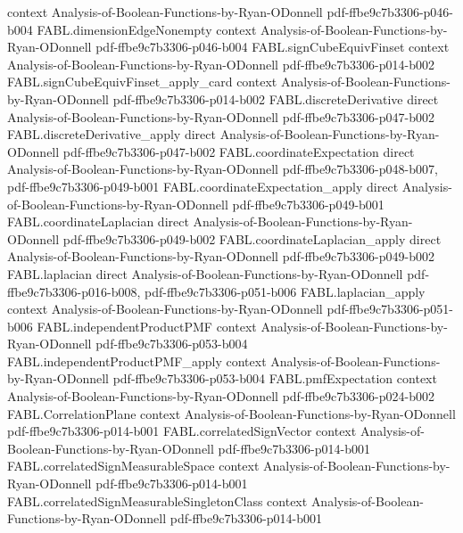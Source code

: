 \begin{theorem}
  {context}
  {Analysis-of-Boolean-Functions-by-Ryan-ODonnell}
  {pdf-ffbe9c7b3306-p046-b004}
\proofstep
  {FABL.dimensionEdgeNonempty}
  {context}
  {Analysis-of-Boolean-Functions-by-Ryan-ODonnell}
  {pdf-ffbe9c7b3306-p046-b004}
\proofstep
  {FABL.signCubeEquivFinset}
  {context}
  {Analysis-of-Boolean-Functions-by-Ryan-ODonnell}
  {pdf-ffbe9c7b3306-p014-b002}
\proofstep
  {FABL.signCubeEquivFinset_apply_card}
  {context}
  {Analysis-of-Boolean-Functions-by-Ryan-ODonnell}
  {pdf-ffbe9c7b3306-p014-b002}
\proofstep
  {FABL.discreteDerivative}
  {direct}
  {Analysis-of-Boolean-Functions-by-Ryan-ODonnell}
  {pdf-ffbe9c7b3306-p047-b002}
\proofstep
  {FABL.discreteDerivative_apply}
  {direct}
  {Analysis-of-Boolean-Functions-by-Ryan-ODonnell}
  {pdf-ffbe9c7b3306-p047-b002}
\proofstep
  {FABL.coordinateExpectation}
  {direct}
  {Analysis-of-Boolean-Functions-by-Ryan-ODonnell}
  {pdf-ffbe9c7b3306-p048-b007,
    pdf-ffbe9c7b3306-p049-b001}
\proofstep
  {FABL.coordinateExpectation_apply}
  {direct}
  {Analysis-of-Boolean-Functions-by-Ryan-ODonnell}
  {pdf-ffbe9c7b3306-p049-b001}
\proofstep
  {FABL.coordinateLaplacian}
  {direct}
  {Analysis-of-Boolean-Functions-by-Ryan-ODonnell}
  {pdf-ffbe9c7b3306-p049-b002}
\proofstep
  {FABL.coordinateLaplacian_apply}
  {direct}
  {Analysis-of-Boolean-Functions-by-Ryan-ODonnell}
  {pdf-ffbe9c7b3306-p049-b002}
\proofstep
  {FABL.laplacian}
  {direct}
  {Analysis-of-Boolean-Functions-by-Ryan-ODonnell}
  {pdf-ffbe9c7b3306-p016-b008,
    pdf-ffbe9c7b3306-p051-b006}
\proofstep
  {FABL.laplacian_apply}
  {context}
  {Analysis-of-Boolean-Functions-by-Ryan-ODonnell}
  {pdf-ffbe9c7b3306-p051-b006}
\proofstep
  {FABL.independentProductPMF}
  {context}
  {Analysis-of-Boolean-Functions-by-Ryan-ODonnell}
  {pdf-ffbe9c7b3306-p053-b004}
\proofstep
  {FABL.independentProductPMF_apply}
  {context}
  {Analysis-of-Boolean-Functions-by-Ryan-ODonnell}
  {pdf-ffbe9c7b3306-p053-b004}
\proofstep
  {FABL.pmfExpectation}
  {context}
  {Analysis-of-Boolean-Functions-by-Ryan-ODonnell}
  {pdf-ffbe9c7b3306-p024-b002}
\proofstep
  {FABL.CorrelationPlane}
  {context}
  {Analysis-of-Boolean-Functions-by-Ryan-ODonnell}
  {pdf-ffbe9c7b3306-p014-b001}
\proofstep
  {FABL.correlatedSignVector}
  {context}
  {Analysis-of-Boolean-Functions-by-Ryan-ODonnell}
  {pdf-ffbe9c7b3306-p014-b001}
\proofstep
  {FABL.correlatedSignMeasurableSpace}
  {context}
  {Analysis-of-Boolean-Functions-by-Ryan-ODonnell}
  {pdf-ffbe9c7b3306-p014-b001}
\proofstep
  {FABL.correlatedSignMeasurableSingletonClass}
  {context}
  {Analysis-of-Boolean-Functions-by-Ryan-ODonnell}
  {pdf-ffbe9c7b3306-p014-b001}

\end{theorem}
